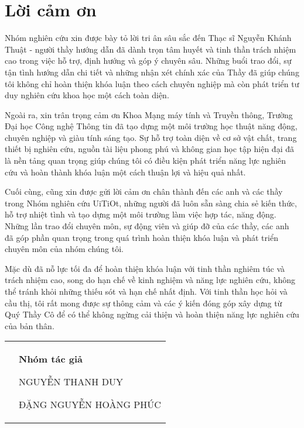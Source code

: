 \chapter*{Lời cảm ơn}
Nhóm nghiên cứu xin được bày tỏ lời tri ân sâu sắc đến Thạc sĩ Nguyễn Khánh Thuật - người thầy hướng dẫn đã dành trọn tâm huyết và tinh thần trách nhiệm cao trong việc hỗ trợ, định hướng và góp ý chuyên sâu. Những buổi trao đổi, sự tận tình hướng dẫn chi tiết và những nhận xét chính xác của Thầy đã giúp chúng tôi không chỉ hoàn thiện khóa luận theo cách chuyên nghiệp mà còn phát triển tư duy nghiên cứu khoa học một cách toàn diện.

Ngoài ra, xin trân trọng cảm ơn Khoa Mạng máy tính và Truyền thông, Trường Đại học Công nghệ Thông tin đã tạo dựng một môi trường học thuật năng động, chuyên nghiệp và giàu tính sáng tạo. Sự hỗ trợ toàn diện về cơ sở vật chất, trang thiết bị nghiên cứu, nguồn tài liệu phong phú và không gian học tập hiện đại đã là nền tảng quan trọng giúp chúng tôi có điều kiện phát triển năng lực nghiên cứu và hoàn thành khóa luận một cách thuận lợi và hiệu quả nhất.

Cuối cùng, cũng xin được gửi lời cảm ơn chân thành đến các anh và các thầy trong Nhóm nghiên cứu UiTiOt, những người đã luôn sẵn sàng chia sẻ kiến thức, hỗ trợ nhiệt tình và tạo dựng một môi trường làm việc hợp tác, năng động. Những lần trao đổi chuyên môn, sự động viên và giúp đỡ của các thầy, các anh đã góp phần quan trọng trong quá trình hoàn thiện khóa luận và phát triển chuyên môn của nhóm chúng tôi.

Mặc dù đã nỗ lực tối đa để hoàn thiện khóa luận với tinh thần nghiêm túc và trách nhiệm cao, song do hạn chế về kinh nghiệm và năng lực nghiên cứu, không thể tránh khỏi những thiếu sót và hạn chế nhất định. Với tinh thần học hỏi và cầu thị, tôi rất mong được sự thông cảm và các ý kiến đóng góp xây dựng từ Quý Thầy Cô để có thể không ngừng cải thiện và hoàn thiện năng lực nghiên cứu của bản thân.
{
\begin{table}[ht]
\centering
\begin{tabular}{>{\centering}m{}>{\centering\arraybackslash}m{}}
 & \textbf{Nhóm tác giả}
 
 NGUYỄN THANH DUY
 
 ĐẶNG NGUYỄN HOÀNG PHÚC
\end{tabular}
\end{table}
}